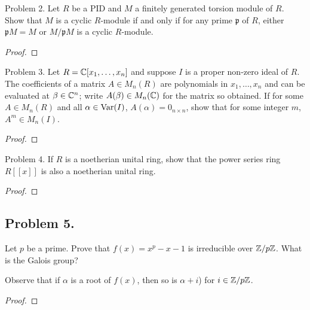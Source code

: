 \documentclass{article}
\begin{document}
\begin{subsection}{Problem 2.}
  Let $R$ be a PID and $M$ a finitely generated torsion module of $R$. Show that
  $M$ is a cyclic $R$-module if and only if for any prime $\mathfrak p$ of $R$,
  either $\mathfrak pM = M$ or $M/\mathfrak pM$ is a cyclic $R$-module.
\end{subsection}

\begin{proof}
\end{proof}
\pagebreak

\begin{subsection}{Problem 3.}
  Let $R = \mathbb C[x_1, \hdots, x_n]$ and suppose $I$ is a proper non-zero ideal of
  $R$. The coefficients of a matrix $A \in M_n(R)$ are polynomials in
  $x_1, \hdots, x_n$ and can be evaluated at $\beta \in \mathbb C^n$; write
  $A(\beta) \in M_n(\mathbb C)$ for the matrix so obtained. If for some $A \in M_n(R)$
  and all $\alpha \in \operatorname{Var}(I)$, $A(\alpha) = 0_{n\times n}$, show that for some
  integer $m$, $A^m \in M_n(I)$.
\end{subsection}

\begin{proof}
\end{proof}
\pagebreak

\begin{subsection}{Problem 4.}
  If $R$ is a noetherian unital ring, show that the power series ring $R[[x]]$
  is also a noetherian unital ring.
\end{subsection}

\begin{proof}
\end{proof}
\pagebreak

\subsection{Problem 5.}
  Let $p$ be a prime. Prove that $f(x) = x^p - x - 1$ is irreducible over
  $\mathbb Z/p\mathbb Z$. What is the Galois group?

\begin{hint}
  Observe that if $\alpha$ is a root of $f(x)$, then so is $\alpha + i$) for $i \in \mathbb Z/p\mathbb Z$.
\end{hint}
\begin{proof}
\end{proof}
\pagebreak
\end{document}
